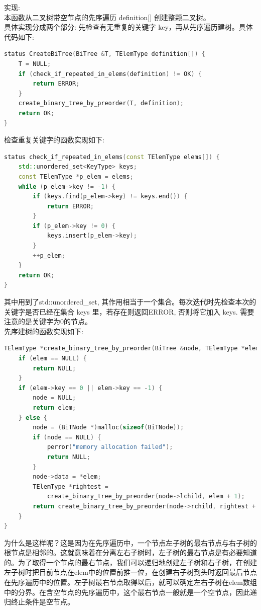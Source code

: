 \documentclass[supercite]{Experimental_Report}
\theoremstyle{definition}
\begin{document}
\noindent
实现: \\
本函数从二叉树带空节点的先序遍历 definition[] 创建整颗二叉树。 \\
具体实现分成两个部分: 先检查有无重复的关键字 key，再从先序遍历建树。具体代码如下:
\begin{lstlisting}[language=C++, frame=single]
status CreateBiTree(BiTree &T, TElemType definition[]) {
	T = NULL;
	if (check_if_repeated_in_elems(definition) != OK) {
		return ERROR;
	}
	create_binary_tree_by_preorder(T, definition);
	return OK;
}
\end{lstlisting}
\noindent
检查重复关键字的函数实现如下:
\begin{lstlisting}[language=C++, frame=single]
status check_if_repeated_in_elems(const TElemType elems[]) {
	std::unordered_set<KeyType> keys;
	const TElemType *p_elem = elems;
	while (p_elem->key != -1) {
		if (keys.find(p_elem->key) != keys.end()) {
			return ERROR;
		}
		if (p_elem->key != 0) {
			keys.insert(p_elem->key);
		}
		++p_elem;
	}
	return OK;
}
\end{lstlisting}
其中用到了std::unordered\_set, 其作用相当于一个集合。每次迭代时先检查本次的关键字是否已经在集合 keys 里，若存在则返回ERROR, 否则将它加入 keys. 需要注意的是关键字为0的节点。 \\
先序建树的函数实现如下:
\begin{lstlisting}[language=C++, frame=single]
TElemType *create_binary_tree_by_preorder(BiTree &node, TElemType *elem) {
	if (elem == NULL) {
        return NULL;
    }
    if (elem->key == 0 || elem->key == -1) {
        node = NULL;
        return elem;
    } else {
        node = (BiTNode *)malloc(sizeof(BiTNode));
        if (node == NULL) {
            perror("memory allocation failed");
            return NULL;
        }
        node->data = *elem;
        TElemType *rightest =
            create_binary_tree_by_preorder(node->lchild, elem + 1);
        return create_binary_tree_by_preorder(node->rchild, rightest + 1);
    }
}
\end{lstlisting}
为什么是这样呢？这是因为在先序遍历中，一个节点左子树的最右节点与右子树的根节点是相邻的。这就意味着在分离左右子树时，左子树的最右节点是有必要知道的。为了取得一个节点的最右节点，我们可以递归地创建左子树和右子树，在创建左子树时把目前节点在elem中的位置前推一位，在创建右子树到头时返回最后节点在先序遍历中的位置。左子树最右节点取得以后，就可以确定左右子树在elem数组中的分界。在含空节点的先序遍历中，这个最右节点一般就是一个空节点，因此递归终止条件是空节点。 \\
\end{document}
